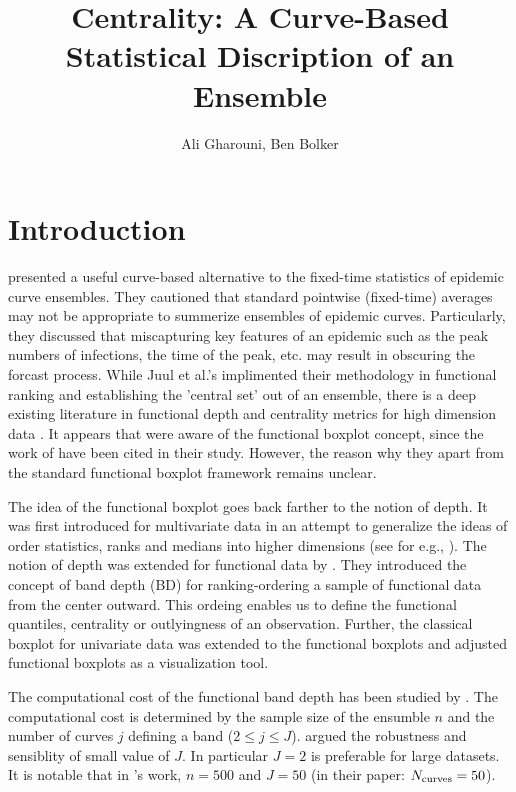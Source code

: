 \documentclass[12pt]{article}
\title{Centrality: A Curve-Based Statistical Discription of an Ensemble}
\author{Ali Gharouni, Ben Bolker}
\theoremstyle{definition} %
\begin{document}
\maketitle
\linenumbers

\section{Introduction}

\cite{juul2021fixed} presented a useful curve-based alternative to the fixed-time statistics of epidemic curve ensembles. 
They cautioned that standard pointwise (fixed-time) averages may not be appropriate to summerize ensembles of epidemic curves. Particularly, they discussed that miscapturing key features of an epidemic such as the peak numbers of infections, the time of the peak, etc. may result in obscuring the forcast process.
While Juul et al.'s implimented their methodology in functional ranking and establishing the 'central set' out of an ensemble, there is a deep existing literature in functional depth and centrality metrics for high dimension data \citep{fraiman2001trimmed, lopez2007depth, lopez2009concept, sun2011functional,sun2012exact}. It appears that \cite{juul2021fixed} were aware of the functional boxplot concept, since the work of \cite{sun2011functional} have been cited in their study. However, the reason why they apart from the standard functional boxplot framework remains unclear.  


The idea of the functional boxplot goes back farther to the notion of depth. It was first introduced for multivariate data in an attempt to generalize the ideas of order statistics, ranks and medians into higher dimensions (see for e.g., \cite{mahalanobis1936generalized,tukey1975mathematics}).
The notion of depth was extended for functional data by \citep{lopez2009concept}. They introduced the concept of band depth (BD) for ranking-ordering  a sample of functional data from the center outward. This ordeing enables us to define the functional quantiles, centrality or outlyingness of an observation. Further, the classical boxplot for univariate data was extended to the functional boxplots and adjusted functional boxplots \citep{sun2011functional,sun2012adjusted} as a visualization tool. 

The computational cost of the functional band depth has been studied by \citep{sun2012exact}. The computational cost is determined by the sample size of the ensumble $n$ and the number of curves $j$ defining a band ($2\leq j \leq J$). \cite{sun2012exact} argued the robustness and sensiblity of  small value of $J$. In particular $J=2$ is preferable for large datasets. It is notable that in \cite{juul2021fixed}'s work, $n=500$ and $J=50$ (in their paper: $N_{\rm{curves}}=50$).
\end{document}
